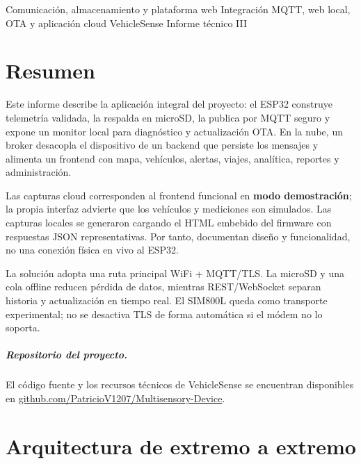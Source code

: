\documentclass[11pt,a4paper,oneside]{report}
\begin{document}
\VScover
  {Comunicación, almacenamiento y plataforma web}
  {Integración MQTT, web local, OTA y aplicación cloud VehicleSense}
  {Informe técnico III}

\chapter*{Resumen}
Este informe describe la aplicación integral del proyecto: el ESP32 construye
telemetría validada, la respalda en microSD, la publica por MQTT seguro y expone un
monitor local para diagnóstico y actualización OTA. En la nube, un broker desacopla
el dispositivo de un backend que persiste los mensajes y alimenta un frontend con
mapa, vehículos, alertas, viajes, analítica, reportes y administración.

Las capturas cloud corresponden al frontend funcional en \textbf{modo demostración};
la propia interfaz advierte que los vehículos y mediciones son simulados. Las capturas
locales se generaron cargando el HTML embebido del firmware con respuestas JSON
representativas. Por tanto, documentan diseño y funcionalidad, no una conexión física
en vivo al ESP32.

\begin{vsidea}[title={Resultado de integración}]
La solución adopta una ruta principal WiFi + MQTT/TLS. La microSD y una cola offline
reducen pérdida de datos, mientras REST/WebSocket separan historia y actualización en
tiempo real. El SIM800L queda como transporte experimental; no se desactiva TLS de
forma automática si el módem no lo soporta.
\end{vsidea}

\paragraph{Repositorio del proyecto.}
El código fuente y los recursos técnicos de VehicleSense se encuentran disponibles en
\href{https://github.com/PatricioV1207/Multisensory-Device}{github.com/PatricioV1207/Multisensory-Device}.

\tableofcontents
\listoffigures
\clearpage
{}

\chapter{Arquitectura de extremo a extremo}
\end{document}
